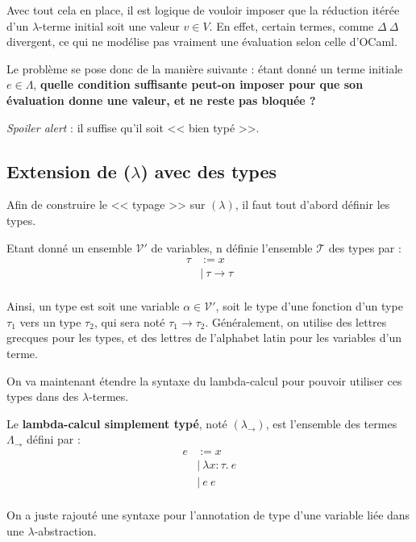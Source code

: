 \documentclass[11pt]{article}
\begin{document}
Avec tout cela en place, il est logique de vouloir imposer que la réduction itérée d'un $\lambda$-terme initial soit une valeur $v\in V$. En effet, certain termes, comme $\Delta~\Delta$ divergent, ce qui ne modélise pas vraiment une évaluation selon celle d'OCaml.

Le problème se pose donc de la manière suivante : étant donné un terme initiale $e\in\Lambda$, \textbf{quelle condition suffisante peut-on imposer pour que son évaluation donne une valeur, et ne reste pas bloquée ?}

\textit{Spoiler alert} : il suffise qu'il soit << bien typé >>.

\subsection{Extension de ($\lambda$) avec des types}

Afin de construire le << typage >> sur $(\lambda)$, il faut tout d'abord définir les types.

\begin{definition}
    Etant donné un ensemble $\mathcal{V}'$ de variables, n définie l'ensemble $\mathcal{T}$ des types par :
    \begin{equation*}
    \begin{aligned}
        \tau &:= x\\
        &\mid~\tau\to\tau\\
    \end{aligned}
    \end{equation*}
\end{definition}

Ainsi, un type est soit une variable $\alpha\in\mathcal{V}'$, soit le type d'une fonction d'un type $\tau_1$ vers un type $\tau_2$, qui sera noté $\tau_1\to\tau_2$. Généralement, on utilise des lettres grecques pour les types, et des lettres de l'alphabet latin pour les variables d'un terme.

On va maintenant étendre la syntaxe du lambda-calcul pour pouvoir utiliser ces types dans des $\lambda$-termes.

\begin{definition}
    Le \textbf{lambda-calcul simplement typé}, noté $\left(\lambda_\rightarrow\right)$, est l'ensemble des termes $\Lambda_\rightarrow$ défini par :
    \begin{equation*}
    \begin{aligned}
        e &:= x\\
        &|~\lambda x: \tau.~e\\
        &|~e~e\\
    \end{aligned}
    \end{equation*}

    On a juste rajouté une syntaxe pour l'annotation de type d'une variable liée dans une $\lambda$-abstraction.
\end{definition}
\end{document}
